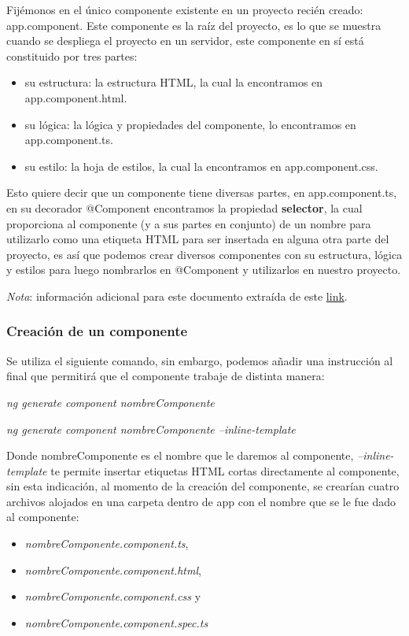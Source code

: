Fijémonos en el único componente existente en un proyecto recién creado: app.component. Este componente es la raíz del proyecto, es lo que se muestra cuando se despliega el proyecto en un servidor, este componente en sí está constituido por tres partes:
\begin{itemize}
    \item su estructura: la estructura HTML, la cual la encontramos en app.component.html.
    \item su lógica: la lógica y propiedades del componente, lo encontramos en app.component.ts.
    \item su estilo: la hoja de estilos, la cual la encontramos en app.component.css.
\end{itemize}

Esto quiere decir que un componente tiene diversas partes, en app.component.ts, en su decorador @Component encontramos la propiedad \textbf{selector}, la cual proporciona al componente (y a sus partes en conjunto) de un nombre para utilizarlo como una etiqueta HTML para ser insertada en alguna otra parte del proyecto, es así que podemos crear diversos componentes con su estructura, lógica y estilos para luego nombrarlos en @Component y utilizarlos en nuestro proyecto.

\textit{Nota}: información adicional para este documento extraída de este \href{https://www.acontracorrientech.com/entendiendo-los-componentes-en-angular/}{link}.


\subsubsection{Creación de un componente}

Se utiliza el siguiente comando, sin embargo, podemos añadir una instrucción al final que permitirá que el componente trabaje de distinta manera:

\textit{ng generate component nombreComponente}

\textit{ng generate component nombreComponente --inline-template}

Donde nombreComponente es el nombre que le daremos al componente, \textit{--inline-template} te permite insertar etiquetas HTML cortas directamente al componente, sin esta indicación, al momento de la creación del componente, se crearían cuatro archivos alojados en una carpeta dentro de app con el nombre que se le fue dado al componente:
\begin{itemize}
    \item \textit{nombreComponente.component.ts},
    \item \textit{nombreComponente.component.html},
    \item \textit{nombreComponente.component.css} y
    \item \textit{nombreComponente.component.spec.ts}
\end{itemize}

